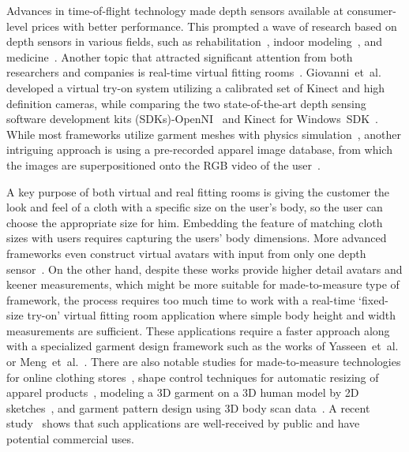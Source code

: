 Advances in time-of-flight technology made depth sensors available at consumer-level prices with better performance. This prompted a wave of research 
based on depth sensors in various fields, such as rehabilitation~\cite{Chang2011}, indoor modeling~\cite{Henry2012}, and medicine~\cite{Gallo2011}. Another 
topic that attracted significant attention from both researchers and companies is real-time virtual fitting rooms~\cite{Meng2010}. Giovanni~et~al.~\cite{Giovanni2012} 
developed a virtual try-on system utilizing a calibrated set of Kinect and high definition cameras, while comparing the two state-of-the-art depth sensing software 
development kits (SDKs)-OpenNI~\cite{OpenNI2102} and Kinect for Windows~SDK~\cite{Microsoft2013}. While most frameworks utilize garment meshes with physics 
simulation~\cite{Fitnect2012,Styku2013}, another intriguing approach is using a pre-recorded apparel image database, from which the images are superpositioned onto the
RGB video of the user~\cite{Hauswiesner2013,Zhou2012}.  

A key purpose of both virtual and real fitting rooms is giving the customer the look and feel of a cloth with a specific size on the user's body, so the user can choose
the appropriate size for him. Embedding the feature of matching cloth sizes with users requires capturing the users' body dimensions. More advanced frameworks even construct
virtual avatars with input from only one depth sensor~\cite{Cui2013,Cui2010}. On the other hand, despite these works provide higher detail avatars and keener measurements,
which might be more suitable for made-to-measure type of framework, the process requires too much time to work with a real-time `fixed-size try-on' virtual fitting room application
where simple body height and width measurements are sufficient. These applications require a faster approach along with a specialized garment design framework such as the works of 
Yasseen~et~al.~\cite{Yasseen2013} or Meng~et~al.~\cite{Meng2010}. There are also notable studies for made-to-measure technologies for online clothing stores~\cite{Cordier2003},
shape control techniques for automatic resizing of apparel products~\cite{Meng2012}, modeling a 3D garment on a 3D human model by 2D sketches~\cite{Wang2003}, and garment pattern
design using 3D body scan data~\cite{Kim2003}. A recent study~\cite{Kim2013} shows that such applications are well-received by public and have potential commercial uses.     

